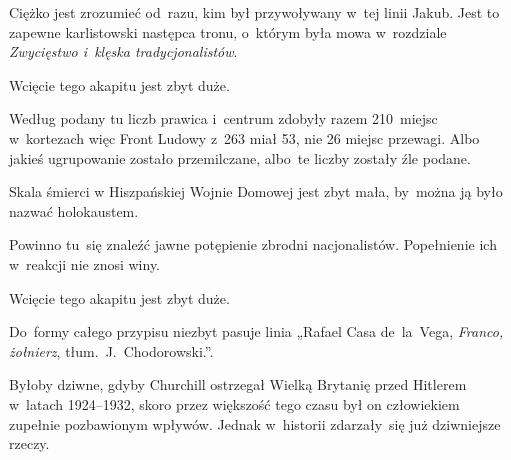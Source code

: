 \documentclass[a4paper,11pt]{article}
\begin{document}
\start {} Ciężko jest zrozumieć od~razu, kim był
przywoływany w~tej linii Jakub. Jest to zapewne karlistowski następca
tronu, o~którym była mowa w~rozdziale \textit{Zwycięstwo i~klęska
  tradycjonalistów}. 

\vspace{\spaceFour}



\start {} Wcięcie tego akapitu jest zbyt duże.

\vspace{\spaceFour}



\start {} Według podany tu liczb prawica i~centrum zdobyły
razem 210~miejsc w~kortezach więc Front Ludowy z~263 miał 53, nie 26
miejsc przewagi. Albo jakieś ugrupowanie zostało przemilczane, albo~te
liczby zostały źle podane.

\vspace{\spaceFour}



\start {} Skala śmierci w Hiszpańskiej Wojnie Domowej jest
zbyt mała, by~można ją było nazwać holokaustem.

\vspace{\spaceFour}



\start {} Powinno tu~się znaleźć jawne potępienie zbrodni
nacjonalistów. Popełnienie ich w~reakcji nie znosi winy.

\vspace{\spaceFour}



\start {} Wcięcie tego akapitu jest zbyt duże.

\vspace{\spaceFour}



\start {} Do~formy całego przypisu niezbyt pasuje linia
„Rafael Casa de~la~Vega, \textit{Franco, żołnierz},
tłum.~J.~Chodorowski.”.

\vspace{\spaceFour}



\start {} Byłoby dziwne, gdyby Churchill ostrzegał Wielką
Brytanię przed Hitlerem w~latach 1924--1932, skoro przez większość tego
czasu był on człowiekiem zupełnie pozbawionym wpływów. Jednak
w~historii zdarzały~się już dziwniejsze rzeczy.

\vspace{\spaceFour}
\end{document}
